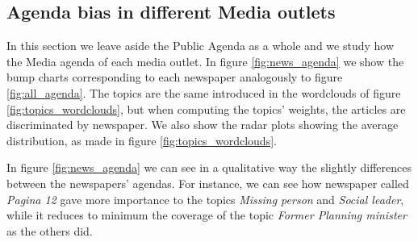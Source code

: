 \documentclass[a4paper, 12pt]{article}
\begin{document}
\subsection{Agenda bias in different Media outlets}

\par In this section we leave aside the Public Agenda as a whole and we study how the Media agenda of each media outlet. 
In figure \ref{fig:news_agenda} we show the bump charts corresponding to each newspaper analogously to figure \ref{fig:all_agenda}.
The topics are the same introduced in the wordclouds of figure \ref{fig:topics_wordclouds}, but when computing the topics' weights,  the articles are discriminated by newspaper. 
We also show the radar plots showing the average distribution, as made in figure \ref{fig:topics_wordclouds}. 
\par In figure \ref{fig:news_agenda} we can see in a qualitative way the slightly differences between the newspapers' agendas.
For instance, we can see how newspaper called \emph{Pagina 12} gave more importance to the topics \emph{Missing person} and \emph{Social leader}, while it reduces to minimum the coverage of the topic  \emph{Former Planning minister} as the others did.
\end{document}
